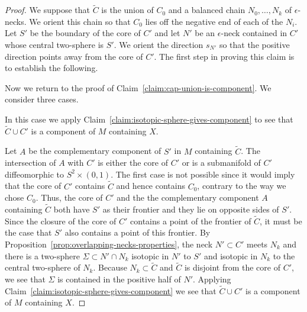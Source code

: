 \begin{proof}
\sketch
{}
We suppose that $\widetilde C$ is the union of $C_0$ and a balanced
chain $N_0,\ldots,N_k$ of $\epsilon$-necks. We orient this chain so
that $C_0$ lies off the negative end of each of the $N_i$.
 Let $S'$ be the boundary of the core of $C'$ and let $N'$ be an
$\epsilon$-neck contained in $C'$ whose central two-sphere is $S'$.
We orient the direction $s_{N'}$ so that the positive direction
points away from the core of  $C'$. The first step in proving this
claim is to establish the following.


Now we return to the proof of Claim~\ref{claim:cap-union-is-component}. We consider
three cases.



 In this case
we apply Claim~\ref{claim:isotopic-sphere-gives-component} to see that $\widetilde C\cup C'$ is a
component of $M$ containing $X$.


  Let $A$ be the complementary component of $S'$ in
$M$ containing $\widetilde C$. The intersection of $A$ with $C'$ is
either the core of $C'$ or is a submanifold of $C'$ diffeomorphic to
$S^2\times (0,1)$. The first case is not possible since it would
imply that the core of $C'$ contains $\widetilde C$ and hence
contains $C_0$, contrary to the way we chose $C_0$. Thus, the core
of $C'$ and the the complementary component $A$ containing
$\widetilde C$ both have $S'$ as their frontier and they lie on
opposite sides of $S'$. Since the closure of the core of $C'$
contains a point of the frontier of $\widetilde C$, it must be the
case that $S'$ also contains a point of this frontier. By
Proposition~\ref{prop:overlapping-necks-properties},  the neck $N'\subset C'$ meets
$N_{k}$ and there is a two-sphere $\Sigma\subset N'\cap N_{k}$
isotopic in $N'$ to $S'$ and isotopic in $N_{k}$ to the central
two-sphere of $N_{k}$. Because $N_{k}\subset \widetilde C$ and
$\widetilde C$ is disjoint from the core of $C'$, we see that
$\Sigma$ is contained in the positive half of $N'$. Applying
Claim~\ref{claim:isotopic-sphere-gives-component} we see that $\widetilde C\cup C'$ is a component
of $M$ containing $X$.



\end{proof}
